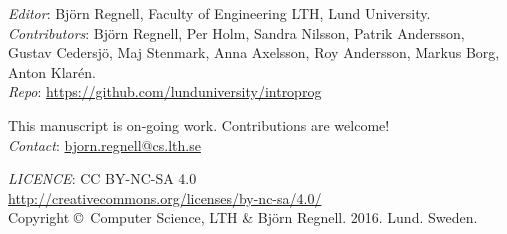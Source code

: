 
\clearpage\null\thispagestyle{empty}
\vfill

{
\setlength{\parindent}{0pt}
\emph{Editor}: Björn Regnell, Faculty of Engineering LTH, Lund University. \\ 

\emph{Contributors}: 
Björn Regnell,
Per Holm,
Sandra Nilsson,
Patrik Andersson,
Gustav Cedersjö,
Maj Stenmark,
Anna Axelsson,
Roy Andersson,
Markus Borg,
Anton Klarén.
\\

\emph{Repo}: \url{https://github.com/lunduniversity/introprog} \\ \newline

This manuscript is on-going work. Contributions are welcome! \\ 
\emph{Contact}: \url{bjorn.regnell@cs.lth.se}
\\ \newline

\emph{LICENCE}: CC BY-NC-SA 4.0 \\
\url{http://creativecommons.org/licenses/by-nc-sa/4.0/}
\\ \newline
Copyright \copyright~Computer Science, LTH \& Björn Regnell. 2016. Lund. Sweden.\\
}
